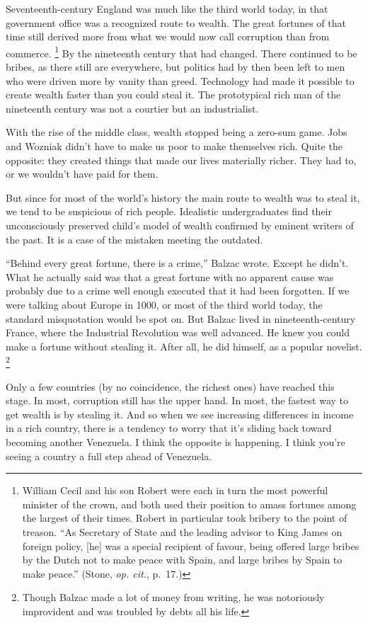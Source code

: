 Seventeenth-century England was much like the third world today, in that
government office was a recognized route to wealth. The great fortunes
of that time still derived more from what we would now call corruption
than from commerce. \footnote{William Cecil and his son Robert were each in turn the most
powerful minister of the crown, and both used their position to amass
fortunes among the largest of their times. Robert in particular took
bribery to the point of treason. ``As Secretary of State and the leading
advisor to King James on foreign policy, {[}he{]} was a special
recipient of favour, being offered large bribes by the Dutch not to make
peace with Spain, and large bribes by Spain to make peace.'' (Stone,
\emph{op. cit.}, p.~17.)} By the nineteenth century
that had changed. There continued to be bribes, as there still are
everywhere, but politics had by then been left to men who were driven
more by vanity than greed. Technology had made it possible to create
wealth faster than you could steal it. The prototypical rich man of the
nineteenth century was not a courtier but an industrialist.

With the rise of the middle class, wealth stopped being a zero-sum game.
Jobs and Wozniak didn't have to make us poor to make themselves rich.
Quite the opposite: they created things that made our lives materially
richer. They had to, or we wouldn't have paid for them.

But since for most of the world's history the main route to wealth was
to steal it, we tend to be suspicious of rich people. Idealistic
undergraduates find their unconsciously preserved child's model of
wealth confirmed by eminent writers of the past. It is a case of the
mistaken meeting the outdated.

``Behind every great fortune, there is a crime,'' Balzac wrote. Except
he didn't. What he actually said was that a great fortune with no
apparent cause was probably due to a crime well enough executed that it
had been forgotten. If we were talking about Europe in 1000, or most of
the third world today, the standard misquotation would be spot on. But
Balzac lived in nineteenth-century France, where the Industrial
Revolution was well advanced. He knew you could make a fortune without
stealing it. After all, he did himself, as a popular novelist.
\footnote{Though Balzac made a lot of money from writing, he was
notoriously improvident and was troubled by debts all his life.}

Only a few countries (by no coincidence, the richest ones) have reached
this stage. In most, corruption still has the upper hand. In most, the
fastest way to get wealth is by stealing it. And so when we see
increasing differences in income in a rich country, there is a tendency
to worry that it's sliding back toward becoming another Venezuela. I
think the opposite is happening. I think you're seeing a country a full
step ahead of Venezuela.

